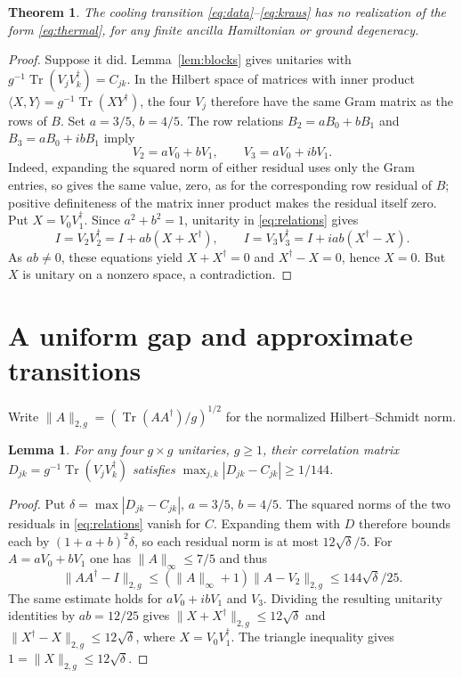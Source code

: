 \documentclass[11pt]{article}
\newtheorem{theorem}{Theorem}
\newtheorem{lemma}{Lemma}
\newcommand{\Tr}{\operatorname{Tr}}
\begin{document}
\begin{theorem}\label{thm:counterexample}
The cooling transition \eqref{eq:data}--\eqref{eq:kraus} has no realization
of the form \eqref{eq:thermal}, for any finite ancilla Hamiltonian or ground
degeneracy.
\end{theorem}
\begin{proof}
Suppose it did. Lemma~\ref{lem:blocks} gives unitaries with
$g^{-1}\Tr(V_jV_k^\dagger)=C_{jk}$. In the Hilbert space of matrices with
inner product $\langle X,Y\rangle=g^{-1}\Tr(XY^\dagger)$, the four $V_j$
therefore have the same Gram matrix as the rows of $B$. Set $a=3/5$, $b=4/5$.
The row relations $B_2=aB_0+bB_1$ and $B_3=aB_0+ibB_1$ imply
\begin{equation}\label{eq:relations}
V_2=aV_0+bV_1,\qquad V_3=aV_0+ibV_1.
\end{equation}
Indeed, expanding the squared norm of either residual uses only the Gram
entries, so gives the same value, zero, as for the corresponding row residual
of $B$; positive definiteness of the matrix inner product makes the residual
itself zero. Put $X=V_0V_1^\dagger$. Since $a^2+b^2=1$, unitarity in
\eqref{eq:relations} gives
\[
I=V_2V_2^\dagger=I+ab(X+X^\dagger),\qquad
I=V_3V_3^\dagger=I+iab(X^\dagger-X).
\]
As $ab\ne0$, these equations yield $X+X^\dagger=0$ and
$X^\dagger-X=0$, hence $X=0$. But $X$ is unitary on a nonzero space,
a contradiction.
\end{proof}

\section{A uniform gap and approximate transitions}
Write $\|A\|_{2,g}=(\Tr(AA^\dagger)/g)^{1/2}$ for the normalized
Hilbert--Schmidt norm.
\begin{lemma}\label{lem:gap}
For any four $g\times g$ unitaries, $g\geq1$, their correlation matrix
$D_{jk}=g^{-1}\Tr(V_jV_k^\dagger)$ satisfies
$\max_{j,k}|D_{jk}-C_{jk}|\geq1/144$.
\end{lemma}
\begin{proof}
Put $\delta=\max|D_{jk}-C_{jk}|$, $a=3/5$, $b=4/5$.
The squared norms of the two residuals in \eqref{eq:relations} vanish
for $C$. Expanding them with $D$ therefore bounds each by
$(1+a+b)^2\delta$, so each residual norm is at most $12\sqrt\delta/5$.
For $A=aV_0+bV_1$ one has $\|A\|_\infty\leq7/5$ and thus
\[
\|AA^\dagger-I\|_{2,g}
\leq(\|A\|_\infty+1)\|A-V_2\|_{2,g}
\leq144\sqrt\delta/25.
\]
The same estimate holds for $aV_0+ibV_1$ and $V_3$.
Dividing the resulting unitarity identities by $ab=12/25$ gives
$\|X+X^\dagger\|_{2,g}\leq12\sqrt\delta$ and
$\|X^\dagger-X\|_{2,g}\leq12\sqrt\delta$, where $X=V_0V_1^\dagger$.
The triangle inequality gives $1=\|X\|_{2,g}\leq12\sqrt\delta$.
\end{proof}
\end{document}
